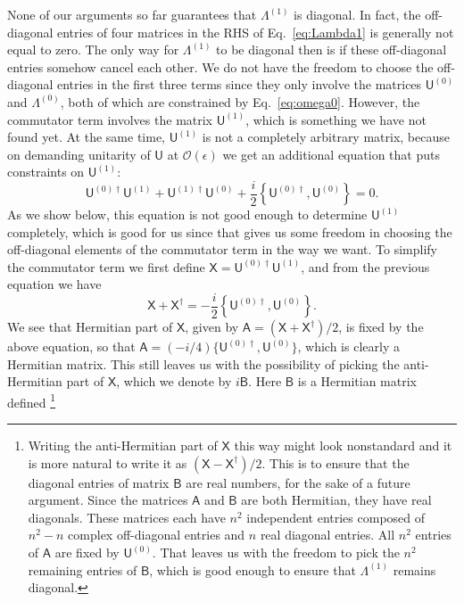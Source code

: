 None of our arguments so far guarantees that $\Lambda^{(1)}$ is diagonal.
In fact, the off-diagonal entries of four matrices in the RHS of Eq.~\eqref{eq:Lambda1} is generally not equal to zero.
The only way for $\Lambda^{(1)}$ to be diagonal then is if these off-diagonal entries somehow cancel each other.
We do not have the freedom to choose the off-diagonal entries in the first three terms since they only involve the matrices $\mathsf{U}^{(0)}$ and $\Lambda^{(0)}$, both of which are constrained by Eq.~\eqref{eq:omega0}.
However, the commutator term involves the matrix $\mathsf{U}^{(1)}$, which is something we have not found yet.
At the same time, $\mathsf{U}^{(1)}$ is not a completely arbitrary matrix, because on demanding unitarity of $\mathsf{U}$ at $\mathcal{O}(\epsilon)$ we get an additional equation that puts constraints on $\mathsf{U}^{(1)}$:
%
\begin{equation}
  \mathsf{U}^{(0)\dagger}\mathsf{U}^{(1)} + \mathsf{U}^{(1)\dagger}\mathsf{U}^{(0)} + \frac{i}{2}\left\{\mathsf{U}^{(0)\dagger}, \mathsf{U}^{(0)}\right\}= 0.
  \label{eq:unitarity}
\end{equation}
%
As we show below, this equation is not good enough to determine $\mathsf{U}^{(1)}$ completely, which is good for us since that gives us some freedom in choosing the off-diagonal elements of the commutator term in the way we want.
To simplify the commutator term we first define $\mathsf{X} = \mathsf{U}^{(0)\dagger}\mathsf{U}^{(1)}$, and from the previous equation we have
%
\begin{equation}
  \mathsf{X} + \mathsf{X}^{\dagger} = -\frac{i}{2}\left\{\mathsf{U}^{(0)\dagger}, \mathsf{U}^{(0)}\right\}.
\end{equation}
%
We see that Hermitian part of $\mathsf{X}$, given by $\mathsf{A} = (\mathsf{X} + \mathsf{X}^{\dagger})/2$, is fixed by the above equation, so that $\mathsf{A} = (-i/4)\{\mathsf{U}^{(0)\dagger},\mathsf{U}^{(0)}\}$, which is clearly a Hermitian matrix.
This still leaves us with the possibility of picking the anti-Hermitian part of $\mathsf{X}$, which we denote by $i\mathsf{B}$. Here $\mathsf{B}$ is a Hermitian matrix defined%
\footnote{%
  Writing the anti-Hermitian part of $\mathsf{X}$ this way might look nonstandard and it is more natural to write it as $(\mathsf{X} - \mathsf{X}^{\dagger})/2$.
  This is to ensure that the diagonal entries of matrix $\mathsf{B}$ are real numbers, for the sake of a future argument.
Since the matrices $\mathsf{A}$ and $\mathsf{B}$ are both Hermitian, they have real diagonals.
  These matrices each have $n^{2}$ independent entries composed of $n^{2} - n$ complex off-diagonal entries and $n$ real diagonal entries.
  All $n^{2}$ entries of $\mathsf{A}$ are fixed by $\mathsf{U}^{(0)}$.
  That leaves us with the freedom to pick the $n^{2}$ remaining entries of $\mathsf{B}$, which is good enough to ensure that $\Lambda^{(1)}$ remains diagonal.
}
